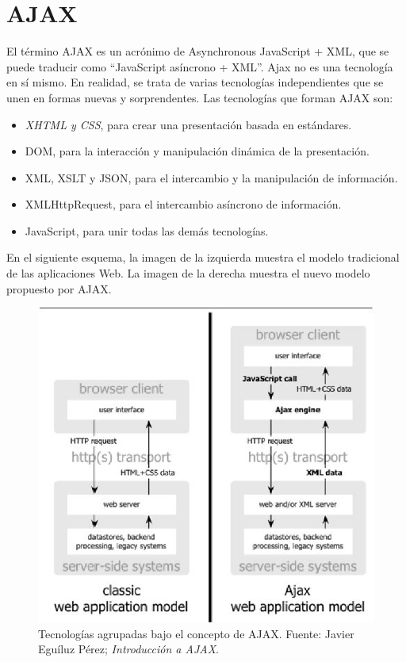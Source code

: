 \section{AJAX}
El t\'ermino AJAX es un acr\'onimo de Asynchronous JavaScript + XML, que se puede traducir como ``JavaScript as\'incrono + XML''. Ajax no es una tecnolog\'ia en s\'i mismo. En realidad, se trata de varias tecnolog\'ias independientes que se unen en formas nuevas y sorprendentes. \cite{ajax}
Las tecnolog\'ias que forman AJAX son:

\begin{itemize}
\item \textsl{XHTML y CSS}, para crear una presentaci\'on basada en est\'andares.
\item DOM, para la interacci\'on y manipulaci\'on din\'amica de la presentaci\'on.
\item XML, XSLT y JSON, para el intercambio y la manipulaci\'on de informaci\'on.
\item XMLHttpRequest, para el intercambio as\'incrono de informaci\'on.
\item JavaScript, para unir todas las dem\'as tecnolog\'ias.
\end{itemize}

En el siguiente esquema, la imagen de la izquierda muestra el modelo tradicional de las aplicaciones Web. La imagen de la derecha muestra el nuevo modelo propuesto por AJAX.

\begin{figure}[h]
\centering
\includegraphics[scale=.7, keepaspectratio=true]{imagenes/02_imagen.png}
\caption{Tecnolog\'ias agrupadas bajo el concepto de AJAX. Fuente: Javier Egu\'iluz P\'erez; \textit{Introducci\'on a AJAX}.}
\end{figure}

